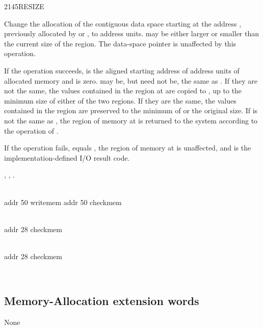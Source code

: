 \begin{worddef}{2145}{RESIZE}
\item {}

	Change the allocation of the contiguous data space starting at
	the address , previously allocated by
	 or , to  address units.
	 may 	be either larger or smaller than the current
	size of the region. The data-space pointer is unaffected by
	this operation.

	If the operation succeeds,  is the aligned
	starting address of  address units of allocated memory
	and  is zero.  may be, but need
	not be, the same as . If they are not the same,
	the values contained in the region at  are copied
	to , up to the minimum size of either of the
	two regions. If they are the same, the values contained in the
	region are preserved to the minimum of  or the original
	size.  If  is not the same as ,
	the region of memory at  is returned to the system
	according to the operation of .

	If the operation fails,  equals ,
	the region of memory at  is unaffected, and
	 is the implementation-defined I/O result code.

\see {},
	,
	.

	\begin{testing}\ttfamily
		 \\
		addr  50 writemem addr  50 checkmem

		 \\
		addr  28 checkmem

		 \\
		addr  28 checkmem

		 \\
	\end{testing}
\end{worddef}


\subsection{Memory-Allocation extension words} %

None
